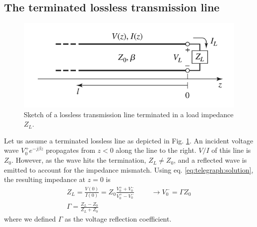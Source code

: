 \subsection{The terminated lossless transmission line}
\begin{figure}
	\centering
	\includegraphics[width=0.4\linewidth]{chapter-theory/figs-RF/pozar_terminated_lossless}
	\caption{Sketch of a lossless transmission line terminated in a load impedance $Z_L$.}
	\label{fig:pozarterminatedlossless}
\end{figure}
Let us assume a terminated lossless line as depicted in Fig. \ref{fig:pozarterminatedlossless}.
An incident voltage wave $V_0^+ e^{-j\beta z}$ propagates from $z<0$ along the line to the right.
$V/I$ of this line is $Z_0$.
However, as the wave hits the termination, $Z_L \neq Z_0$, and a reflected wave is emitted to account for the impedance mismatch.
Using eq. \ref{eq:telegraph:solution}, the resulting impedance at $z=0$ is 
\begin{align}
Z_L=\frac{V(0)}{I(0)}=Z_0\frac{V_0^++V_0^-}{V_0^+-V_0^-} \hspace{1cm} \rightarrow V_0^-=\Gamma Z_0 \\%
\Gamma = \frac{Z_L-Z_0}{Z_L+Z_0}
\end{align} 
where we defined $\Gamma$ as the voltage reflection coefficient.

